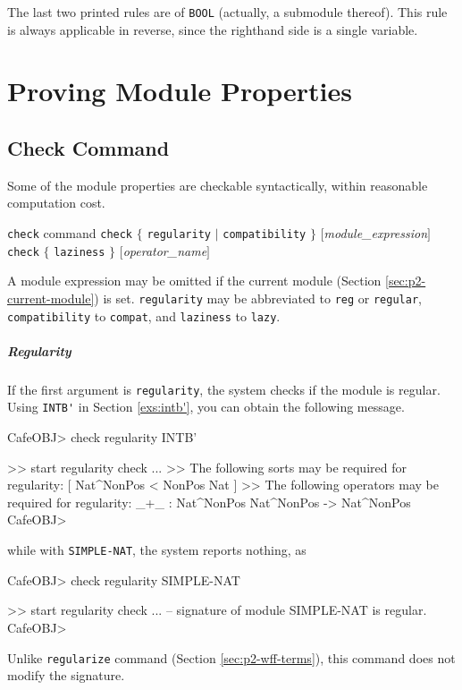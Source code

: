 \documentclass[a4paper]{memoir}
\begin{document}
\begin{warning}
  The last two printed rules are of \verb|BOOL|
  (actually, a submodule thereof). This rule is always applicable in
  reverse, since the righthand side is a single variable.
\end{warning}

\chapter{Proving Module Properties}\label{sec:p2-semantic-prop}

\section{Check Command}\label{sec:p2-check-command}

Some of the module properties are checkable syntactically, within
reasonable computation cost.

\begin{bsyntax} \texttt{check} command \Hline
{}
\texttt{check} $\{$ \texttt{regularity} $|$ \texttt{compatibility} $\}$ $[$\textit{module\_expression}$]$
\texttt{check} $\{$ \texttt{laziness} $\}$ $[$\textit{operator\_name}$]$
\end{bsyntax}

A module expression may be omitted if the current module
(Section \ref{sec:p2-current-module}) is set.
\verb|regularity| may be abbreviated to \verb|reg| or \verb|regular|,
\verb|compatibility| to \verb|compat|, and \verb|laziness| to \verb|lazy|.

\paragraph{Regularity}

If the first argument is \verb|regularity|, the system checks
if the module is regular.
Using \verb|INTB'| in Section \ref{exs:intb'}, you can
obtain the following message.
\begin{vvtm}
\begin{ccode}
  CafeOBJ> check regularity INTB'

  >> start regularity check ...
  >> The following sorts may be required for regularity:
    [ Nat^NonPos < NonPos Nat ]
  >> The following operators may be required for regularity:
    _+_ : Nat^NonPos Nat^NonPos -> Nat^NonPos
  CafeOBJ> 
\end{ccode}
\end{vvtm}
while with \verb|SIMPLE-NAT|, the system reports nothing, as
\begin{vvtm}
\begin{ccode}
  CafeOBJ> check regularity SIMPLE-NAT

  >> start regularity check ...
  -- signature of module SIMPLE-NAT is regular.
  CafeOBJ> 
\end{ccode}
\end{vvtm}
Unlike \verb|regularize| command (Section \ref{sec:p2-wff-terms}),
this command does not modify the signature.
\end{document}
